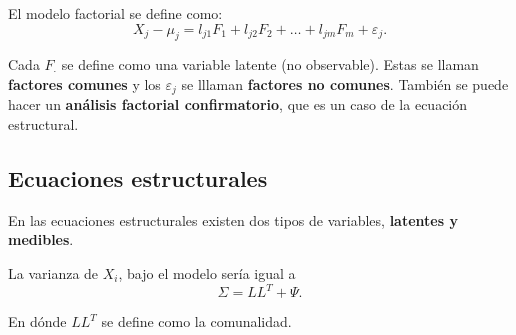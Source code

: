 \documentclass{article}
\begin{document}
El modelo factorial se define como:
\[ X_{j}-\mu_{j}=l_{j1}F_{1}+l_{j2}F_{2}+\ldots+l_{jm}F_{m}+\varepsilon_{j}.\]

Cada $F_{\cdot}$ se define como una variable latente (no observable). Estas se llaman \textbf{factores comunes} y los $\varepsilon_{j}$ se lllaman \textbf{factores no comunes}. También se puede hacer un \textbf{análisis factorial confirmatorio}, que es un caso de la ecuación estructural.

\subsection{Ecuaciones estructurales}
En las ecuaciones estructurales existen dos tipos de variables, \textbf{latentes y medibles}.

La varianza de $X_{i}$, bajo el modelo sería igual a
\[ \Sigma=LL^{T}+\Psi.\]

En dónde $LL^{T}$ se define como la comunalidad.
\end{document}
